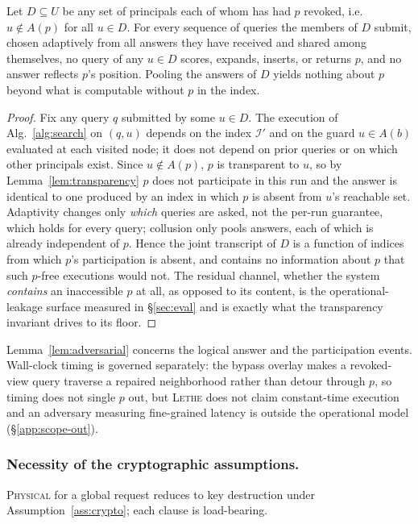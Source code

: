 \documentclass[sigconf, nonacm, review]{acmart}
\begin{document}
\begin{lemma}
\label{lem:adversarial}
Let $D\subseteq U$ be any set of principals each of whom has had $p$ revoked,
i.e.\ $u\notin A(p)$ for all $u\in D$. For every sequence of queries the
members of $D$ submit, chosen adaptively from all answers they have received
and shared among themselves, no query of any $u\in D$ scores, expands, inserts,
or returns $p$, and no answer reflects $p$'s position. Pooling the answers of
$D$ yields nothing about $p$ beyond what is computable without $p$ in the
index.
\end{lemma}
\begin{proof}
Fix any query $q$ submitted by some $u\in D$. The execution of
Alg.~\ref{alg:search} on $(q,u)$ depends on the index $\mathcal{I}'$ and on the
guard $u\in A(b)$ evaluated at each visited node; it does not depend on prior
queries or on which other principals exist. Since $u\notin A(p)$, $p$ is
transparent to $u$, so by Lemma~\ref{lem:transparency} $p$ does not
participate in this run and the answer is identical to one produced by an index
in which $p$ is absent from $u$'s reachable set. Adaptivity changes only
\emph{which} queries are asked, not the per-run guarantee, which holds for
every query; collusion only pools answers, each of which is already independent
of $p$. Hence the joint transcript of $D$ is a function of indices from which
$p$'s participation is absent, and contains no information about $p$ that such
$p$-free executions would not. The residual channel, whether the system
\emph{contains} an inaccessible $p$ at all, as opposed to its content, is
the operational-leakage surface measured in \S\ref{sec:eval} and is exactly
what the transparency invariant drives to its floor.
\end{proof}

\begin{remark}
\label{rem:scope-timing}
Lemma~\ref{lem:adversarial} concerns the logical answer and the participation
events. Wall-clock timing is governed separately: the bypass overlay makes a
revoked-view query traverse a repaired neighborhood rather than detour through
$p$, so timing does not single $p$ out, but \textsc{Lethe} does not claim
constant-time execution and an adversary measuring fine-grained latency is
outside the operational model (\S\ref{app:scope-out}).
\end{remark}

\subsubsection{Necessity of the cryptographic assumptions.}
\label{app:scope-necessity}
\textsc{Physical} for a global request reduces to key destruction under
Assumption~\ref{ass:crypto}; each clause is load-bearing.
\end{document}
